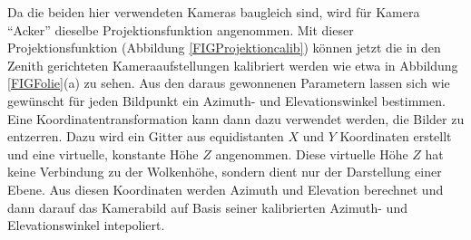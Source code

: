 \documentclass[a4paper,11pt,twoside,german]{article}
\newcommand{\absatz}{\smallbreak}
\begin{document}
Da die beiden hier verwendeten Kameras baugleich sind, wird für Kamera
\enquote{Acker} dieselbe Projektionsfunktion angenommen.  Mit dieser
Projektionsfunktion (Abbildung \ref{FIGProjektioncalib}) können jetzt die in den
Zenith gerichteten Kameraaufstellungen kalibriert werden wie etwa in Abbildung
\ref{FIGFolie}(a) zu sehen. Aus den daraus gewonnenen Parametern lassen sich wie
gewünscht für jeden Bildpunkt ein Azimuth- und Elevationswinkel bestimmen. 
\absatz 
Eine Koordinatentransformation kann dann dazu verwendet werden, die
Bilder zu entzerren. Dazu wird ein Gitter aus equidistanten $X$ und $Y$
Koordinaten erstellt und eine virtuelle, konstante Höhe $Z$ angenommen. Diese
virtuelle Höhe $Z$ hat keine Verbindung zu der Wolkenhöhe, sondern dient nur der
Darstellung einer Ebene. Aus diesen Koordinaten werden Azimuth und Elevation
berechnet und dann darauf das Kamerabild auf Basis seiner kalibrierten Azimuth-
und Elevationswinkel intepoliert.
\end{document}
